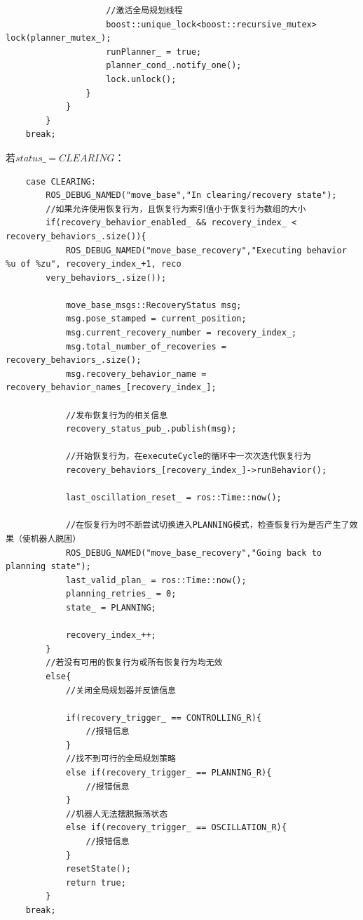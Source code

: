 \documentclass[9pt, oneside]{book}
\begin{document}
\begin{verbatim}
                    //激活全局规划线程
                    boost::unique_lock<boost::recursive_mutex> lock(planner_mutex_);
                    runPlanner_ = true;
                    planner_cond_.notify_one();
                    lock.unlock();
                }
            }
        }
    break;
\end{verbatim}
\normalsize

若$status\_=CLEARING$：

\footnotesize
\begin{verbatim}
    case CLEARING:
        ROS_DEBUG_NAMED("move_base","In clearing/recovery state");
        //如果允许使用恢复行为，且恢复行为索引值小于恢复行为数组的大小
        if(recovery_behavior_enabled_ && recovery_index_ < recovery_behaviors_.size()){
            ROS_DEBUG_NAMED("move_base_recovery","Executing behavior %u of %zu", recovery_index_+1, reco
        very_behaviors_.size());

            move_base_msgs::RecoveryStatus msg;
            msg.pose_stamped = current_position;
            msg.current_recovery_number = recovery_index_;
            msg.total_number_of_recoveries = recovery_behaviors_.size();
            msg.recovery_behavior_name =  recovery_behavior_names_[recovery_index_];

            //发布恢复行为的相关信息
            recovery_status_pub_.publish(msg);

            //开始恢复行为，在executeCycle的循环中一次次迭代恢复行为
            recovery_behaviors_[recovery_index_]->runBehavior();

            last_oscillation_reset_ = ros::Time::now();

            //在恢复行为时不断尝试切换进入PLANNING模式，检查恢复行为是否产生了效果（使机器人脱困）
            ROS_DEBUG_NAMED("move_base_recovery","Going back to planning state");
            last_valid_plan_ = ros::Time::now();
            planning_retries_ = 0;
            state_ = PLANNING;

            recovery_index_++;
        }
        //若没有可用的恢复行为或所有恢复行为均无效
        else{
            //关闭全局规划器并反馈信息

            if(recovery_trigger_ == CONTROLLING_R){
                //报错信息
            }
            //找不到可行的全局规划策略
            else if(recovery_trigger_ == PLANNING_R){
                //报错信息
            }
            //机器人无法摆脱振荡状态
            else if(recovery_trigger_ == OSCILLATION_R){
                //报错信息
            }
            resetState();
            return true;
        }
    break;
\end{verbatim}
\normalsize
\end{document}
